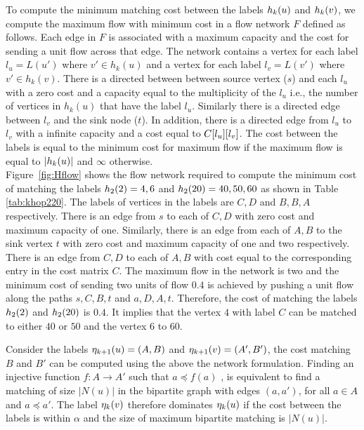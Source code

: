  To compute the minimum matching
cost between the \khop labels $h_{k}(u)$ and $h_{k}(v)$, we compute the
maximum flow with minimum cost in a flow network $F$ defined as follows.  Each
edge in $F$ is associated with a maximum capacity and the cost for sending a
unit flow across that edge.  The network contains a vertex for each label $l_u =
L(u')$ where $v' \in h_k(u)$ and a vertex for each label $l_v = L(v')$ where $v'
\in h_k(v)$. There is a directed between between source vertex ($s$) and each
$l_u$ with a zero cost and a capacity equal to the multiplicity of the $l_u$
i.e., the number of vertices in $h_k(u)$ that have the label $l_u$. Similarly
there is a directed edge between $l_v$ and the sink node ($t$). In addition,
there is a directed edge from $l_u$ to $l_v$ with a infinite capacity and a cost
equal to ${C}[l_u][l_v]$. The cost between the \khop labels is equal to
the minimum cost for maximum flow if the maximum flow is equal to
$|h_{k}(u)|$ and $\infty$ otherwise.  \\ Figure~\ref{fig:Hflow} shows the
flow network required to compute the minimum cost of matching the \khop labels
$h_{2}(2) = 4,6 $ and $h_{2}(20) = 40, 50, 60$ as shown in Table
\ref{tab:khop220}. The labels of vertices in the \khop labels are $C,D$ and $B,
B, A$ respectively. There is an edge from $s$ to each of $C, D$ with zero cost
and maximum capacity of one.  Similarly, there is an edge from each of $A, B$ to
the sink vertex $t$ with zero cost and maximum capacity of one and two
respectively. There is an edge from $C, D$ to each of $A, B$ with cost equal to
the corresponding entry in the cost matrix $C$. The maximum flow in the network
is two and the minimum cost of sending two units of flow $0.4$ is achieved by
pushing a unit flow along the paths $s, C, B, t$ and $a, D, A, t$.  Therefore,
the cost of matching the labels $h_{2}(2)$ and $h_{2}(20)$ is $0.4$. It
implies that the vertex $4$ with label $C$ can be matched to either $40$ or $50$
and the vertex $6$ to $60$.

 Consider the 
\ncl labels $\eta_{k+1}(u) = (A, B)$ and  $\eta_{k+1}(v) = (A', B')$, the cost matching
$B$ and $B'$ can be computed using the above the network formulation.
Finding an injective function $f\!\!:A \rightarrow A'$ such that $a \preceq
f(a)$ , is equivalent to find a matching of size $|N(u)|$ in the bipartite graph
with edges $(a, a')$, for all $a \in A$ and $a \preceq a'$.
The \ncl label $\eta_{k}(v)$ therefore dominates $\eta_{k}(u)$ if the
cost between the \khop labels is within $\alpha$ and the size of maximum
bipartite matching is $|N(u)|$.

